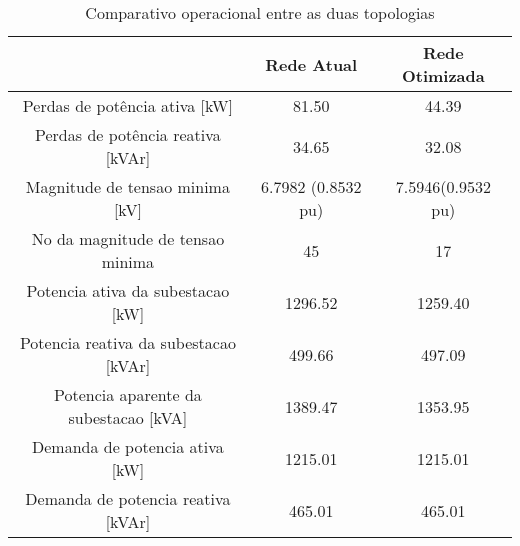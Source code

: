 \begin{table}[H]
    \centering
    \caption{Comparativo operacional entre as duas topologias}
    \label{tab:comp_topologias}
    \begin{tabular}{|c|c|c|}
    \hline
    & Rede Atual & Rede Otimizada\\ \hline
    Perdas de potência ativa [kW]           & 81.50 & 44.39\\ \hline
    Perdas de potência reativa [kVAr]       & 34.65 & 32.08\\ \hline
    Magnitude de tensao minima [kV]         & 6.7982 (0.8532 pu) & 7.5946(0.9532 pu)\\ \hline 
    No da magnitude de tensao minima        & 45 & 17\\ \hline
    Potencia ativa da subestacao [kW]       & 1296.52 & 1259.40\\ \hline
    Potencia reativa da subestacao [kVAr]   & 499.66  & 497.09\\ \hline
    Potencia aparente da subestacao [kVA]   & 1389.47 & 1353.95\\ \hline
    Demanda de potencia ativa [kW]          & 1215.01 & 1215.01\\ \hline 
    Demanda de potencia reativa [kVAr]      & 465.01  & 465.01\\ \hline
    \end{tabular}
\end{table}